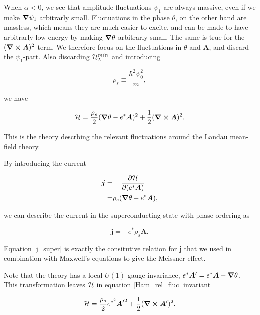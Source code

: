When $\alpha<0$, we see that amplitude-fluctuations $\psi_1$ are always massive, even if we make $\grad \psi_1$ arbitrarly small. Fluctuations in the phase $\theta$, on the other hand are massless, which means they are much easier to excite, and can be made to have arbitrarly low energy by making $\grad \theta$ arbitrarly small. The same is true for the $(\grad \cross \bm{A})^2$-term. We therefore focus on the fluctuations in $\theta$ and $\bm{A}$, and discard the $\psi_1$-part.  Also discarding $\mathcal{H}_L^{min}$ and introducing 

\begin{equation}
\rho_s \equiv \frac{\hbar^2 \psi_0^2}{m},
\end{equation}

we have 

\begin{equation}
\mathcal{H} = \frac{\rho_s}{2}  (\grad \theta - e^* \bm{A} )^2 + \frac{1}{2}({\grad} \cross \bm{A} )^2.
\label{Ham_rel_fluc} 
\end{equation}

This is the theory descrbing the relevant fluctuations around the Landau mean-field theory.

By introducing the current 



\begin{equation}
\begin{aligned}
\bm{j} =& - \frac{\partial \mathcal{H}}{\partial (e^* \bm{A})} \\
=& \rho_s (\grad \theta - e^*\bm{A}),
\end{aligned}
\end{equation}

we can describe the current in the superconducting state with phase-ordering as 

\begin{equation}
\bm{j}  = -e^* \rho_s \bm{A}.
\label{j_super} 
\end{equation}

Equation \cref{j_super} is exactly the consitutive relation for $\bm{j}$ that we used in combination with Maxwell's equations to give the Meissner-effect.

Note that the theory has a local $U(1)$ gauge-invariance, $e^*\bm{A}' =  e^*\bm{A} - \grad \theta$. This transformation leaves $\mathcal{H}$ in equation \cref{Ham_rel_fluc} invariant

\begin{equation}
\mathcal{H} = \frac{\rho_s}{2} e^{*^2} {\bm{A}'}^2 + \frac{1}{2}({\grad} \cross \bm{A}')^2.
\label{Ham_rel_fluc_inv} 
\end{equation}

